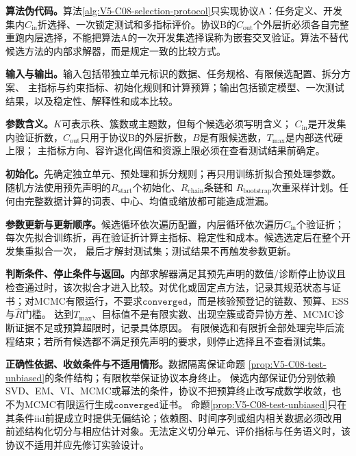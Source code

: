 \label{struct:V5-C08-CH19}
\textbf{算法伪代码。}算法\ref{alg:V5-C08-selection-protocol}只实现协议A：任务定义、开发集内$C_{\mathrm{in}}$折选择、一次锁定测试和多指标评价。协议B的$C_{\mathrm{out}}$个外层折必须各自完整重跑内层选择，不能把算法A的一次开发集选择误称为嵌套交叉验证。算法不替代候选方法的内部求解器，而是规定一致的比较方式。

\label{struct:V5-C08-CH20}
\textbf{输入与输出。}输入包括带独立单元标识的数据、任务规格、有限候选配置、拆分方案、
主指标与约束指标、初始化规则和计算预算；输出包括锁定模型、一次测试结果，以及稳定性、解释性和成本比较。

\label{struct:V5-C08-CH21}
\textbf{参数含义。}$K$可表示秩、簇数或主题数，但每个候选必须写明含义；
$C_{\mathrm{in}}$是开发集内验证折数，$C_{\mathrm{out}}$只用于协议B的外层折数，$B$是有限候选数，$T_{\max}$是内部迭代硬上限；
主指标方向、容许退化阈值和资源上限必须在查看测试结果前确定。

\label{struct:V5-C08-CH22}
\textbf{初始化。}先确定独立单元、预处理和拆分规则；再只用训练折拟合预处理参数。
随机方法使用预先声明的$R_{\mathrm{start}}$个初始化、$R_{\mathrm{chain}}$条链和
$R_{\mathrm{bootstrap}}$次重采样计划。任何由完整数据计算的词表、中心、均值或缩放都可能造成泄漏。

\label{struct:V5-C08-CH23}
\textbf{参数更新与更新顺序。}候选循环依次遍历配置，内层循环依次遍历$C_{\mathrm{in}}$个验证折；
每次先拟合训练折，再在验证折计算主指标、稳定性和成本。候选选定后在整个开发集重拟合一次，
最后才解封测试集；测试结果不再触发参数更新。

\label{struct:V5-C08-CH24}
\textbf{判断条件、停止条件与返回。}内部求解器满足其预先声明的数值/诊断停止协议且检查通过时，该次拟合才进入比较。对优化或固定点方法，记录其规范状态与证书；对MCMC有限运行，不要求$\mathtt{converged}$，而是核验预登记的链数、预算、ESS与$\widehat R$门槛。
达到$T_{\max}$、目标值不是有限实数、出现空簇或奇异协方差、MCMC诊断证据不足或预算超限时，记录具体原因。
有限候选和有限折全部处理完毕后流程结束；若所有候选都不满足预先声明的要求，则停止选择且不查看测试集。

\label{struct:V5-C08-CH25}
\textbf{正确性依据、收敛条件与不适用情形。}数据隔离保证命题
\ref{prop:V5-C08-test-unbiased}的条件结构；有限枚举保证协议本身终止。
候选内部保证仍分别依赖SVD、EM、VI、MCMC或幂法的条件，协议不把预算终止改写成数学收敛，也不为MCMC有限运行生成$\mathtt{converged}$证书。
命题\ref{prop:V5-C08-test-unbiased}只在其条件iid前提成立时提供无偏结论；依赖图、时间序列或组内相关数据必须改用前述结构化切分与相应估计对象。无法定义切分单元、评价指标与任务语义时，该协议不适用并应先修订实验设计。

